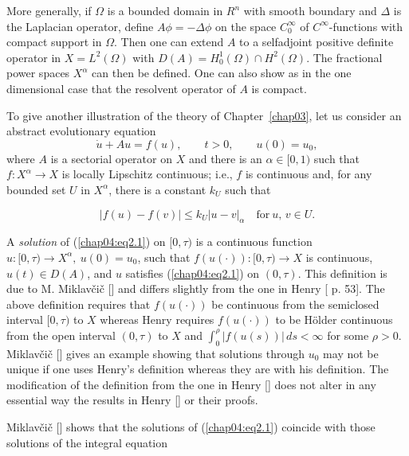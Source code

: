 \documentclass{surv-l}
\theoremstyle{plain}
\theoremstyle{definition}
\numberwithin{equation}{section}
\numberwithin{figure}{chapter}
\begin{document}
More generally, if $\Omega$ is a bounded domain in $R^{n}$ with smooth boundary and $\Delta$ is the Laplacian operator, define $ A\phi=-\Delta\phi$ on the space $C_{0}^{\infty}$ of
$C^{\infty}$-functions with compact support in $\Omega$. Then one can extend $A$ to a selfadjoint positive definite operator in $X=L^{2}(\Omega)$ with $D(A)=H_{0}^{1}(\Omega)\cap H^{2}(\Omega)$. The fractional power spaces $X^{\alpha}$ can then be defined. One can also show as in the one dimensional case that the resolvent operator of $A$ is compact.

To give another illustration of the theory of Chapter~\ref{chap03}, let us consider an abstract evolutionary equation
\begin{equation}\label{chap04:eq2.1}
\dot{u}+Au=f(u),\qquad t>0,\qquad u(0)=u_{0},
\end{equation}
where $A$ is a sectorial operator on $X$ and there is an $\alpha\in[0,1)$ such that
$f\!: X^{\alpha}\rightarrow X$ is locally Lipschitz continuous; i.e., $f$ is continuous and, for any bounded set $U$ in $X^{\alpha}$, there is a constant $k_{U}$ such that

\begin{equation*}
|f(u)-f(v)|\leq k_{U}|u-v|_{\alpha}\quad \mathrm{for}\ u,\,v\in U.
\end{equation*}

A \emph{solution} of (\ref{chap04:eq2.1}) on $[0, \tau)$ is a continuous function $u\!:[0, \tau)\rightarrow X^{\alpha},\ u(0)=u_{0}$, such that $f(u(\cdot))\!:[0, \tau)\rightarrow X$ is continuous, $u(t)\in D(A)$, and $u$ satisfies (\ref{chap04:eq2.1}) on
$(0, \tau)$. This definition is due to M. Miklav\v{c}i\v{c} [\citeyear{1985m}] and differs slightly from the one in Henry [\citeyear{1981henry} p. 53]. The above definition requires that $f(u(\cdot))$ be continuous from the semiclosed interval $[0, \tau)$ to $X$ whereas Henry requires $f(u(\cdot))$ to be H\"{o}lder continuous from the open interval $(0, \tau)$ to $X$ and
$\int_{0}^{\rho}|f(u(s))|\,ds<\infty$ for some $\rho>0$. Miklav\v{c}i\v{c} [\citeyear{1985m}] gives an example showing that solutions through $u_{0}$ may not be unique if one uses Henry's definition whereas they are with his definition. The modification of the definition from the one in Henry [\citeyear{1981henry}] does not alter in any essential way the results in Henry [\citeyear{1981henry}] or their proofs.

Miklav\v{c}i\v{c} [\citeyear{1985m}] shows that the solutions of (\ref{chap04:eq2.1}) coincide with those solutions of the integral equation
\end{document}

